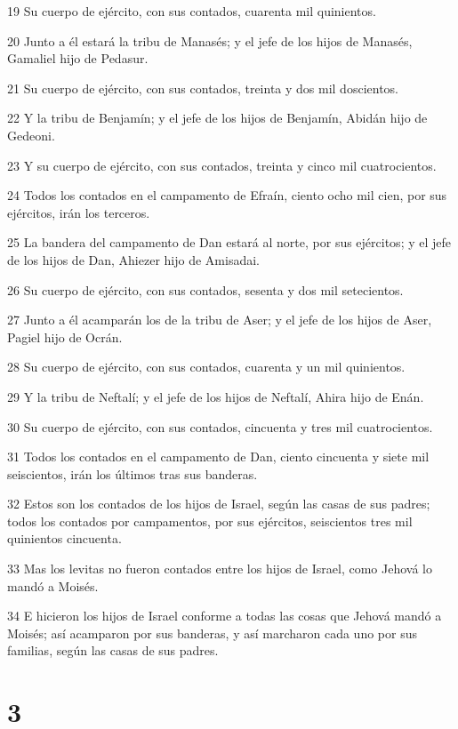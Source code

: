 \par 19 Su cuerpo de ejército, con sus contados, cuarenta mil quinientos.
\par 20 Junto a él estará la tribu de Manasés; y el jefe de los hijos de Manasés, Gamaliel hijo de Pedasur.
\par 21 Su cuerpo de ejército, con sus contados, treinta y dos mil doscientos.
\par 22 Y la tribu de Benjamín; y el jefe de los hijos de Benjamín, Abidán hijo de Gedeoni.
\par 23 Y su cuerpo de ejército, con sus contados, treinta y cinco mil cuatrocientos.
\par 24 Todos los contados en el campamento de Efraín, ciento ocho mil cien, por sus ejércitos, irán los terceros.
\par 25 La bandera del campamento de Dan estará al norte, por sus ejércitos; y el jefe de los hijos de Dan, Ahiezer hijo de Amisadai.
\par 26 Su cuerpo de ejército, con sus contados, sesenta y dos mil setecientos.
\par 27 Junto a él acamparán los de la tribu de Aser; y el jefe de los hijos de Aser, Pagiel hijo de Ocrán.
\par 28 Su cuerpo de ejército, con sus contados, cuarenta y un mil quinientos.
\par 29 Y la tribu de Neftalí; y el jefe de los hijos de Neftalí, Ahira hijo de Enán.
\par 30 Su cuerpo de ejército, con sus contados, cincuenta y tres mil cuatrocientos.
\par 31 Todos los contados en el campamento de Dan, ciento cincuenta y siete mil seiscientos, irán los últimos tras sus banderas.
\par 32 Estos son los contados de los hijos de Israel, según las casas de sus padres; todos los contados por campamentos, por sus ejércitos, seiscientos tres mil quinientos cincuenta.
\par 33 Mas los levitas no fueron contados entre los hijos de Israel, como Jehová lo mandó a Moisés.
\par 34 E hicieron los hijos de Israel conforme a todas las cosas que Jehová mandó a Moisés; así acamparon por sus banderas, y así marcharon cada uno por sus familias, según las casas de sus padres.

\chapter{3}

